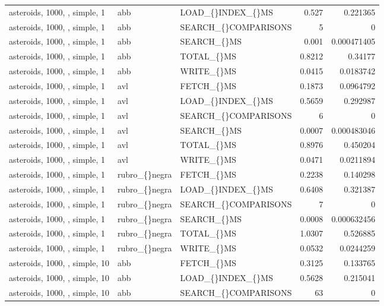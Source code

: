 \begin{longtable}{p{4cm}p{1.4cm}p{2.6cm}rr}
asteroids, 1000, , simple, 1 & abb & LOAD\_\allowbreak\{\}INDEX\_\allowbreak\{\}MS & 0.527 & 0.221365\\
asteroids, 1000, , simple, 1 & abb & SEARCH\_\allowbreak\{\}COMPARISONS & 5 & 0\\
asteroids, 1000, , simple, 1 & abb & SEARCH\_\allowbreak\{\}MS & 0.001 & 0.000471405\\
asteroids, 1000, , simple, 1 & abb & TOTAL\_\allowbreak\{\}MS & 0.8212 & 0.34177\\
asteroids, 1000, , simple, 1 & abb & WRITE\_\allowbreak\{\}MS & 0.0415 & 0.0183742\\
asteroids, 1000, , simple, 1 & avl & FETCH\_\allowbreak\{\}MS & 0.1873 & 0.0964792\\
asteroids, 1000, , simple, 1 & avl & LOAD\_\allowbreak\{\}INDEX\_\allowbreak\{\}MS & 0.5659 & 0.292987\\
asteroids, 1000, , simple, 1 & avl & SEARCH\_\allowbreak\{\}COMPARISONS & 6 & 0\\
asteroids, 1000, , simple, 1 & avl & SEARCH\_\allowbreak\{\}MS & 0.0007 & 0.000483046\\
asteroids, 1000, , simple, 1 & avl & TOTAL\_\allowbreak\{\}MS & 0.8976 & 0.450204\\
asteroids, 1000, , simple, 1 & avl & WRITE\_\allowbreak\{\}MS & 0.0471 & 0.0211894\\
asteroids, 1000, , simple, 1 & rubro\_\allowbreak\{\}negra & FETCH\_\allowbreak\{\}MS & 0.2238 & 0.140298\\
asteroids, 1000, , simple, 1 & rubro\_\allowbreak\{\}negra & LOAD\_\allowbreak\{\}INDEX\_\allowbreak\{\}MS & 0.6408 & 0.321387\\
asteroids, 1000, , simple, 1 & rubro\_\allowbreak\{\}negra & SEARCH\_\allowbreak\{\}COMPARISONS & 7 & 0\\
asteroids, 1000, , simple, 1 & rubro\_\allowbreak\{\}negra & SEARCH\_\allowbreak\{\}MS & 0.0008 & 0.000632456\\
asteroids, 1000, , simple, 1 & rubro\_\allowbreak\{\}negra & TOTAL\_\allowbreak\{\}MS & 1.0307 & 0.526885\\
asteroids, 1000, , simple, 1 & rubro\_\allowbreak\{\}negra & WRITE\_\allowbreak\{\}MS & 0.0532 & 0.0244259\\
asteroids, 1000, , simple, 10 & abb & FETCH\_\allowbreak\{\}MS & 0.3125 & 0.133765\\
asteroids, 1000, , simple, 10 & abb & LOAD\_\allowbreak\{\}INDEX\_\allowbreak\{\}MS & 0.5628 & 0.215041\\
asteroids, 1000, , simple, 10 & abb & SEARCH\_\allowbreak\{\}COMPARISONS & 63 & 0\\

\end{longtable}
